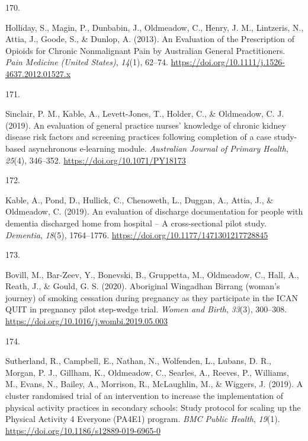 \documentclass[11pt, a4paper]{awesome-cv}
\newlength{\csllabelwidth}
\newcommand{\CSLLeftMargin}[1]{\parbox[t]{\csllabelwidth}{#1}}
\newcommand{\CSLRightInline}[1]{\parbox[t]{\linewidth - \csllabelwidth}{#1}}
\begin{document}
\leavevmode\hypertarget{ref-holliday_evaluation_2013}{}%
\CSLLeftMargin{170. }
\CSLRightInline{Holliday, S., Magin, P., Dunbabin, J., Oldmeadow, C.,
Henry, J. M., Lintzeris, N., Attia, J., Goode, S., \& Dunlop, A. (2013).
An Evaluation of the Prescription of Opioids for Chronic Nonmalignant
Pain by Australian General Practitioners. \emph{Pain Medicine (United
States)}, \emph{14}(1), 62--74.
\url{https://doi.org/10.1111/j.1526-4637.2012.01527.x}}

\leavevmode\hypertarget{ref-sinclair_evaluation_2019}{}%
\CSLLeftMargin{171. }
\CSLRightInline{Sinclair, P. M., Kable, A., Levett-Jones, T., Holder,
C., \& Oldmeadow, C. J. (2019). An evaluation of general practice
nurses' knowledge of chronic kidney disease risk factors and screening
practices following completion of a case study-based asynchronous
e-learning module. \emph{Australian Journal of Primary Health},
\emph{25}(4), 346--352. \url{https://doi.org/10.1071/PY18173}}

\leavevmode\hypertarget{ref-kable_evaluation_2019}{}%
\CSLLeftMargin{172. }
\CSLRightInline{Kable, A., Pond, D., Hullick, C., Chenoweth, L., Duggan,
A., Attia, J., \& Oldmeadow, C. (2019). An evaluation of discharge
documentation for people with dementia discharged home from hospital --
A cross-sectional pilot study. \emph{Dementia}, \emph{18}(5),
1764--1776. \url{https://doi.org/10.1177/1471301217728845}}

\leavevmode\hypertarget{ref-bovill_aboriginal_2020}{}%
\CSLLeftMargin{173. }
\CSLRightInline{Bovill, M., Bar-Zeev, Y., Bonevski, B., Gruppetta, M.,
Oldmeadow, C., Hall, A., Reath, J., \& Gould, G. S. (2020). Aboriginal
Wingadhan Birrang (woman's journey) of smoking cessation during
pregnancy as they participate in the ICAN QUIT in pregnancy pilot
step-wedge trial. \emph{Women and Birth}, \emph{33}(3), 300--308.
\url{https://doi.org/10.1016/j.wombi.2019.05.003}}

\leavevmode\hypertarget{ref-sutherland_cluster_2019}{}%
\CSLLeftMargin{174. }
\CSLRightInline{Sutherland, R., Campbell, E., Nathan, N., Wolfenden, L.,
Lubans, D. R., Morgan, P. J., Gillham, K., Oldmeadow, C., Searles, A.,
Reeves, P., Williams, M., Evans, N., Bailey, A., Morrison, R.,
McLaughlin, M., \& Wiggers, J. (2019). A cluster randomised trial of an
intervention to increase the implementation of physical activity
practices in secondary schools: Study protocol for scaling up the
Physical Activity 4 Everyone (PA4E1) program. \emph{BMC Public Health},
\emph{19}(1). \url{https://doi.org/10.1186/s12889-019-6965-0}}
\end{document}
